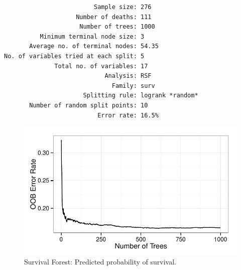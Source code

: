 \documentclass[nojss]{jss}\usepackage[]{graphicx}\usepackage[]{color}
\makeatletter
\def\maxwidth{ %
  \ifdim\Gin@nat@width>\linewidth
    \linewidth
  \else
    \Gin@nat@width
  \fi
}
\newenvironment{kframe}{%
 \def\at@end@of@kframe{}%
 \ifinner\ifhmode%
  \def\at@end@of@kframe{\end{minipage}}%
  \begin{minipage}{\columnwidth}%
 \fi\fi%
 \def\FrameCommand##1{\hskip\@totalleftmargin \hskip-\fboxsep
 \colorbox{shadecolor}{##1}\hskip-\fboxsep
     \hskip-\linewidth \hskip-\@totalleftmargin \hskip\columnwidth}%
 \MakeFramed {\advance\hsize-\width
   \@totalleftmargin\z@ \linewidth\hsize
   \@setminipage}}%
 {\par\unskip\endMakeFramed%
 \at@end@of@kframe}
\newenvironment{knitrout}{}{} %
\makeatother
\begin{document}

\begin{knitrout}\footnotesize
{}\color{fgcolor}\begin{kframe}
\begin{verbatim}
                         Sample size: 276
                    Number of deaths: 111
                     Number of trees: 1000
          Minimum terminal node size: 3
       Average no. of terminal nodes: 54.35
No. of variables tried at each split: 5
              Total no. of variables: 17
                            Analysis: RSF
                              Family: surv
                      Splitting rule: logrank *random*
       Number of random split points: 10
                          Error rate: 16.5%
\end{verbatim}
\end{kframe}\begin{figure}[!htpb]


{\centering \includegraphics[width=\maxwidth]{figure/beamer-surv-rf-error-1} 

}

\caption[Survival Forest]{Survival Forest: Predicted probability of survival.\label{fig:surv-rf-error}}
\end{figure}


\end{knitrout}
\end{document}
